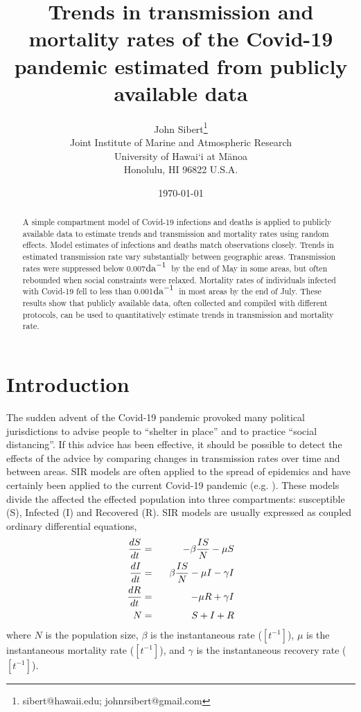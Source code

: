 \documentclass[12pt,letterpaper]{article}
\title{Trends in transmission and mortality rates of the Covid-19
pandemic estimated from publicly available data}
\author{
John Sibert\thanks{sibert@hawaii.edu; johnrsibert@gmail.com}\\
Joint Institute of Marine and Atmospheric Research\\
University of Hawai`i at M\={a}noa\\
Honolulu, HI  96822 U.S.A.\\[0.125in]
\date{\today}
}
\newcommand\doublespacing{\baselineskip=1.6\normalbaselineskip}
\newcommand\perda{$\rm{da}^{-1}$}
\begin{document}
\maketitle

\doublespacing

\begin{abstract}
A simple compartment model of Covid-19 infections and deaths is
applied to publicly available data to estimate trends and transmission
and mortality rates using random effects. Model estimates of
infections and deaths match observations closely. Trends in
estimated transmission rate vary substantially between geographic
areas. Transmission rates were suppressed below 0.007\perda\ by the
end of May in some areas, but often rebounded when social constraints
were relaxed.
Mortality rates of individuals infected with Covid-19 fell to less than
0.001\perda\ in most areas by the end of July.
These results show that publicly available data, often collected and
compiled with different protocols, can be used to quantitatively
estimate trends in transmission and mortality rate.
\end{abstract}

\section*{Introduction}

The sudden advent of the Covid-19 pandemic provoked many political
jurisdictions to advise people to ``shelter in place'' and to practice
``social distancing''. If this advice has been effective, it should be
possible to detect the effects of the advice by comparing changes in
transmission rates over time and between areas. 
SIR models are often applied to the spread of epidemics and have
certainly been applied to the current Covid-19 pandemic
(e.g. \cite{Chen2020,Roques2020}).
These models divide the affected the effected population into three
compartments: susceptible (S), Infected (I) and Recovered (R).
SIR models are
usually expressed as coupled ordinary differential equations,
\begin{eqnarray}
\label{eqn:SIR}
\frac{dS}{dt} &=& -\beta\frac{IS}{N} - \mu S\\
\frac{dI}{dt} &=& \hphantom{-}\beta\frac{IS}{N} - \mu I -\gamma I\\
\frac{dR}{dt} &=&  -\mu R +\gamma I\\
N &=& S + I + R
\end{eqnarray}
where $N$ is the population size, $\beta$ is the instantaneous
rate ($[t^{-1}]$), $\mu$ is the instantaneous mortality rate
($[t^{-1}]$),
and $\gamma$ is the instantaneous recovery rate ($[t^{-1}]$).  
\end{document}
